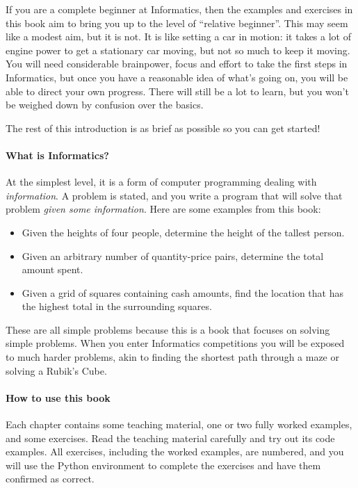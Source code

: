 

If you are a complete beginner at Informatics, then the examples and exercises in this
book aim to bring you up to the level of ``relative beginner''. This may seem like a
modest aim, but it is not. It is like setting a car in motion: it takes a lot of engine
power to get a stationary car moving, but not so much to keep it moving. You will need
considerable brainpower, focus and effort to take the first steps in Informatics, but once
you have a reasonable idea of what's going on, you will be able to direct your own
progress. There will still be a lot to learn, but you won't be weighed down by confusion
over the basics.

The rest of this introduction is as brief as possible so you can get started!

\paragraph{What is Informatics?} At the simplest level, it is a form of computer programming
dealing with \emph{information}. A problem is stated, and you write a program that will
solve that problem \emph{given some information}. Here are some examples from this book:
\begin{itemize}
  \item Given the heights of four people, determine the height of the tallest person.
  \item Given an arbitrary number of quantity-price pairs, determine the total amount
    spent.
  \item Given a grid of squares containing cash amounts, find the location that has the
    highest total in the surrounding squares.
\end{itemize}

These are all simple problems because this is a book that focuses on solving simple
problems. When you enter Informatics competitions you will be exposed to much harder
problems, akin to finding the shortest path through a maze or solving a Rubik's Cube.

\paragraph{How to use this book} Each chapter contains some teaching material, one or two
fully worked examples, and some exercises. Read the teaching material carefully and try
out its code examples. All exercises, including the worked examples, are numbered, and you
will use the \textbf{\learninformatics} Python environment to complete the exercises and
have them confirmed as correct.

